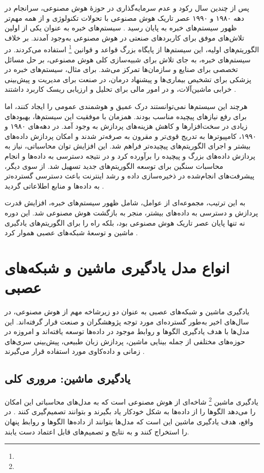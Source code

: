 پس از چندین سال رکود و عدم سرمایه‌گذاری در حوزهٔ هوش مصنوعی، سرانجام در دهه ۱۹۸۰ و ۱۹۹۰ عصر تاریک هوش مصنوعی با تحولات تکنولوژی و از همه مهم‌تر ظهور سیستم‌های خبره به پایان رسید \cite{feigenbaum1983handbook}. سیستم‌های خبره به عنوان یکی از اولین تلاش‌های موفق برای کاربردهای صنعتی در هوش مصنوعی به‌وجود آمدند. بر خلاف الگوریتم‌های اولیه، این سیستم‌ها از پایگاه بزرگ قواعد و قوانین \footnote{} استفاده می‌کردند. در سیستم‌های خبره، به جای تلاش برای شبیه‌سازی کلی هوش مصنوعی، بر حل مسائل تخصصی برای صنایع و سازمان‌ها تمرکز می‌شد. برای مثال، سیستم‌های خبره در پزشکی برای تشخیص بیماری‌ها و پیشنهاد درمان، در صنعت برای مدیریت و پیش‌بینی خرابی ماشین‌آلات، و در امور مالی برای تحلیل و ارزیابی ریسک کاربرد داشتند \cite{mccorduck2004machines}.

هرچند این سیستم‌ها نمی‌توانستند درک عمیق و هوشمندی عمومی را ایجاد کنند، اما برای رفع نیازهای پیچیده مناسب بودند. همزمان با موفقیت این سیستم‌ها، بهبودهای زیادی در سخت‌افزارها و کاهش هزینه‌های پردازش به وجود آمد. در دهه‌های ۱۹۸۰ و ۱۹۹۰، کامپیوترها به تدریج قوی‌تر و مقرون به صرفه‌تر شدند و امکان پردازش داده‌های بیشتر و اجرای الگوریتم‌های پیچیده‌تر فراهم شد. این افزایش توان محاسباتی، نیاز به پردازش داده‌های بزرگ و پیچیده را برآورده کرد و در نتیجه دسترسی به داده‌ها و انجام محاسبات سنگین برای توسعه الگوریتم‌های جدید تسهیل شد. از سوی دیگر، پیشرفت‌های انجام‌شده در ذخیره‌سازی داده و رشد اینترنت باعث دسترسی گسترده‌تر به داده‌ها و منابع اطلاعاتی گردید \cite{nilsson2010quest}.

به این ترتیب، مجموعه‌ای از عوامل، شامل ظهور سیستم‌های خبره، افزایش قدرت پردازش و دسترسی به داده‌های بیشتر، منجر به بازگشت هوش مصنوعی شد. این دوره نه تنها پایان عصر تاریک هوش مصنوعی بود، بلکه راه را برای الگوریتم‌های یادگیری ماشین و توسعهٔ شبکه‌های عصبی هموار کرد \cite{russell2016artificial}.


\section{انواع مدل یادگیری ماشین و شبکه‌های عصبی}\label{sec:ml-types}
یادگیری ماشین و شبکه‌های عصبی به عنوان دو زیرشاخه مهم از هوش مصنوعی، در سال‌های اخیر به‌طور گسترده‌ای مورد توجه پژوهشگران و صنعت قرار گرفته‌اند. این مدل‌ها با هدف یادگیری الگوها و روابط موجود در داده‌ها توسعه یافته‌اند و امروزه در حوزه‌های مختلفی از جمله بینایی ماشین، پردازش زبان طبیعی، پیش‌بینی سری‌های زمانی و داده‌کاوی مورد استفاده قرار می‌گیرند \cite{bishop2006pattern,mitchell1997machine,murphy2012machine}.

\subsection{یادگیری ماشین: مروری کلی}
یادگیری ماشین \footnote{} شاخه‌ای از هوش مصنوعی است که به مدل‌های محاسباتی این امکان را می‌دهد الگوها را از داده‌ها به شکل خودکار یاد بگیرند و بتوانند تصمیم‌گیری کنند
\cite{goodfellow2016deep,mitchell1997machine}.
در واقع، هدف یادگیری ماشین این است که مدل‌ها بتوانند از داده‌ها الگوها و روابط پنهان را استخراج کنند و به نتایج و تصمیم‌های قابل اعتماد دست یابند.

